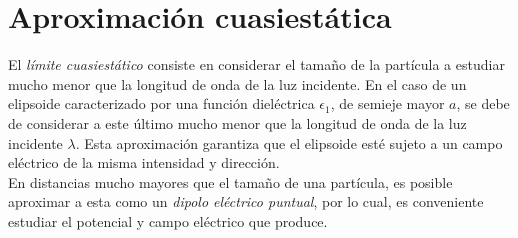 \section{Aproximación cuasiestática}

El \textit{límite cuasiestático} consiste en considerar el tamaño de la partícula a estudiar mucho menor que la longitud de onda de la luz incidente. En el caso de un elipsoide caracterizado por una función dieléctrica $\epsilon_1$, de semieje mayor $a$, se debe de considerar a este último mucho menor que la longitud de onda de la luz incidente $\lambda$. Esta aproximación garantiza que el elipsoide esté sujeto a un campo eléctrico de la misma intensidad y dirección. \cite{Miguel}\\


En distancias mucho mayores que el tamaño de una partícula, es posible aproximar a esta como un \textit{dipolo eléctrico puntual}, por lo cual, es conveniente estudiar el potencial y campo eléctrico que produce.\\

